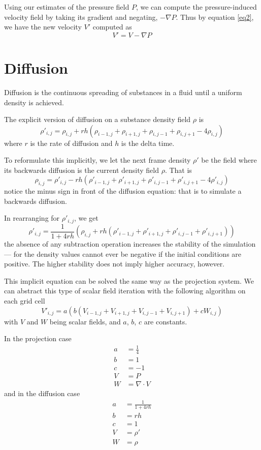 \documentclass[11pt]{article}
\begin{document}
Using our estimates of the pressure field $P$, we can compute the pressure-induced velocity field by taking its gradient and negating, $-\nabla P$. Thus by equation \ref{eq2}, we have the new velocity $V'$ computed as
\[
	V' = V - \nabla P
\]

\section{Diffusion}
Diffusion is the continuous spreading of substances in a fluid until a uniform density is achieved.

The explicit version of diffusion on a substance density field $\rho$ is
\[
	\rho'_{i,j} = \rho_{i,j} + rh (\rho_{i-1, j} + \rho_{i+1, j} + \rho_{i,j-1} + \rho_{i,j+1} - 4 \rho_{i,j})
\]
where $r$ is the rate of diffusion and $h$ is the delta time.

To reformulate this implicitly, we let the next frame density $\rho'$ be the field where its backwards diffusion is the current density field $\rho$. That is
\[
    \rho_{i,j} = \rho'_{i,j} - rh(\rho'_{i-1, j} + \rho'_{i+1, j} + \rho'_{i,j-1} + \rho'_{i,j+1} - 4\rho'_{i,j})
\]
notice the minus sign in front of the diffusion equation: that is to simulate a backwards diffusion.

In rearranging for $\rho'_{i,j}$, we get
\[
    \rho'_{i,j} = \frac{1}{1+4rh} \left(\rho_{i,j} + rh(\rho'_{i-1, j} + \rho'_{i+1, j} + \rho'_{i,j-1} + \rho'_{i,j+1})\right)
\]
the absence of any subtraction operation increases the stability of the simulation --- for the density values cannot ever be negative if the initial conditions are positive. The higher stability does not imply higher accuracy, however.

This implicit equation can be solved the same way as the projection system. We can abstract this type of scalar field iteration with the following algorithm on each grid cell
\[
    V'_{i,j} = a (b(V_{i-1,j} + V_{i+1, j} + V_{i,j-1} + V_{i,j+1}) + c W_{i,j})
\]
with $V$ and $W$ being scalar fields, and $a$, $b$, $c$ are constants.

In the projection case
\begin{align*}
    a &= \frac{1}{4}\\
    b &= 1\\
    c &= -1\\
    V &= P\\
    W &= \nabla \cdot V
\end{align*}
and in the diffusion case
\begin{align*}
    a &= \frac{1}{1+4rh}\\
    b &= rh\\
    c &= 1\\
    V &= \rho'\\
    W &= \rho
\end{align*}
\end{document}
